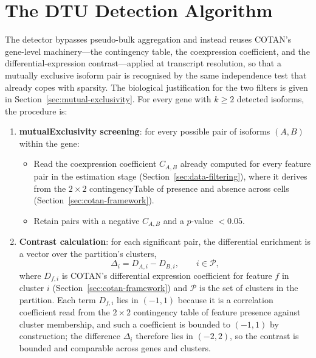 \section{The DTU Detection Algorithm}\label{sec:methods-dtu-algorithm}

The detector bypasses pseudo-bulk aggregation and instead reuses COTAN's gene-level machinery---the contingency table, the \gls{coexpression} coefficient, and the differential-expression contrast---applied at transcript resolution, so that a mutually exclusive isoform pair is recognised by the same independence test that already copes with sparsity\cite{galfre2021cotan}. The biological justification for the two filters is given in Section~\ref{sec:mutual-exclusivity}. For every gene with $k \ge 2$ detected isoforms, the procedure is:

\begin{enumerate}
    \item \textbf{\gls{mutualExclusivity} screening}: for every possible pair of isoforms $(A, B)$ within the gene:
    \begin{itemize}
        \item Read the \gls{coexpression} coefficient $C_{A,B}$ already computed for every feature pair in the estimation stage (Section~\ref{sec:data-filtering}), where it derives from the $2 \times 2$ \gls{contingencyTable} of presence and absence across cells\cite{galfre2021cotan} (Section~\ref{sec:cotan-framework}).
        \item Retain pairs with a negative $C_{A,B}$ and a $p$-value $< 0.05$.
    \end{itemize}

    \item \textbf{Contrast calculation}: for each significant pair, the differential enrichment is a vector over the partition's clusters,
    \begin{equation}
        \Delta_i = D_{A,i} - D_{B,i}, \qquad i \in \mathcal{P},
    \end{equation}
    where $D_{f,i}$ is COTAN's differential expression coefficient for feature $f$ in cluster $i$ (Section~\ref{sec:cotan-framework}) and $\mathcal{P}$ is the set of clusters in the partition. Each term $D_{f,i}$ lies in $(-1,1)$ because it is a correlation coefficient read from the $2 \times 2$ contingency table of feature presence against cluster membership, and such a coefficient is bounded to $(-1,1)$ by construction; the difference $\Delta_i$ therefore lies in $(-2,2)$, so the contrast is bounded and comparable across genes and clusters.


\end{enumerate}
